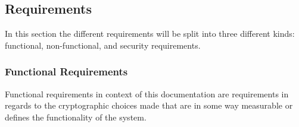 \subsection{Requirements} \label{sec: requirements}
In this section the different requirements will be split into three different kinds: functional, non-functional, and security requirements.


\subsubsection{Functional Requirements} \label{sec: functional requirements}
Functional requirements in context of this documentation are requirements in regards to the cryptographic choices made that are in some way measurable or defines the functionality of the system. %

